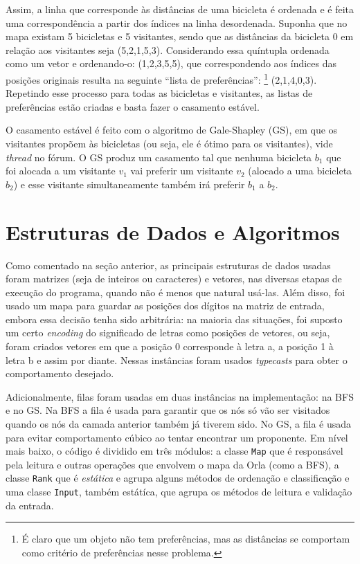 \documentclass{article}
\def\code#1{\texttt{#1}}
\begin{document}
Assim, a linha que corresponde às distâncias de uma bicicleta é ordenada e é feita uma correspondência a partir dos índices na linha desordenada. Suponha que no mapa existam 5 bicicletas e 5 visitantes, sendo que as distâncias da bicicleta 0 em relação aos visitantes seja (5,2,1,5,3). Considerando essa quíntupla ordenada como um vetor e ordenando-o: (1,2,3,5,5), que correspondendo aos índices das posições originais resulta na seguinte ``lista de preferências'': \footnote{É claro que um objeto não tem preferências, mas as distâncias se comportam como critério de preferências nesse problema.} (2,1,4,0,3). Repetindo esse processo para todas as bicicletas e visitantes, as listas de preferências estão criadas e basta fazer o casamento estável.

O casamento estável é feito com o algoritmo de Gale-Shapley (GS), em que os visitantes propõem às bicicletas (ou seja, ele é ótimo para os visitantes), vide \textit{thread} no fórum. O GS produz um casamento tal que nenhuma bicicleta \( b_1 \) que foi alocada a um visitante \( v_1 \) vai preferir um visitante \( v_2 \) (alocado a uma bicicleta \( b_2 \)) e esse visitante simultaneamente também irá preferir \( b_1 \) a \( b_2 \).

\section{Estruturas de Dados e Algoritmos}

Como comentado na seção anterior, as principais estruturas de dados usadas foram matrizes (seja de inteiros ou caracteres) e vetores, nas diversas etapas de execução do programa, quando não é menos que natural usá-las. Além disso, foi usado um mapa para guardar as posições dos dígitos na matriz de entrada, embora essa decisão tenha sido arbitrária: na maioria das situações, foi suposto um certo \textit{encoding} do significado de letras como posições de vetores, ou seja, foram criados vetores em que a posição 0 corresponde à letra a, a posição 1 à letra b e assim por diante. Nessas instâncias foram usados \textit{typecasts} para obter o comportamento desejado.

Adicionalmente, filas foram usadas em duas instâncias na implementação: na BFS e no GS. Na BFS a fila é usada para garantir que os nós só vão ser visitados quando os nós da camada anterior também já tiverem sido. No GS, a fila é usada para evitar comportamento cúbico ao tentar encontrar um proponente. Em nível mais baixo, o código é dividido em três módulos: a classe \code{Map} que é responsável pela leitura e outras operações que envolvem o mapa da Orla (como a BFS), a classe \code{Rank} que é \textit{estática} e agrupa alguns métodos de ordenação e classificação e uma classe \code{Input}, também estátíca, que agrupa os métodos de leitura e validação da entrada.
\end{document}
